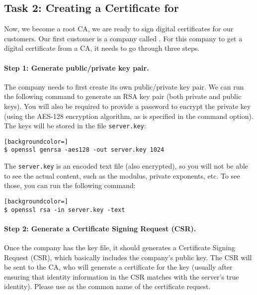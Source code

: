 \subsection{Task 2: Creating a Certificate for \pkiserver}

Now, we become a root CA, we are ready to sign digital certificates for 
our customers. Our first customer is a company called \pkiserver.
For this company to get a digital certificate from a CA, it needs to
go through three steps.


\paragraph{Step 1: Generate public/private key pair.}
The company needs to first create its own public/private key pair. We can run  
the following command to generate an RSA key pair (both private and public keys).  
You will also be required to provide a password to encrypt the private 
key (using the AES-128 encryption algorithm, as is specified in the command option). 
The keys will be stored in the file \texttt{server.key}:

\begin{lstlisting}[backgroundcolor=]
$ openssl genrsa -aes128 -out server.key 1024
\end{lstlisting}

The \texttt{server.key} is an encoded text file (also encrypted), 
so you will not be able to see the actual content, such as the modulus, private exponents, etc. To see
those, you can run the following command:

\begin{lstlisting}[backgroundcolor=]
$ openssl rsa -in server.key -text
\end{lstlisting}



\paragraph{Step 2: Generate a Certificate Signing Request (CSR).}
Once the company has the key file, it should generates a Certificate Signing Request (CSR), 
which basically includes the company's public key. 
The CSR will be sent to the CA, who will generate a certificate 
for the key (usually after ensuring that identity information in 
the CSR matches with the server's true identity). Please 
use \pkiserver as the common name of the certificate 
request.

